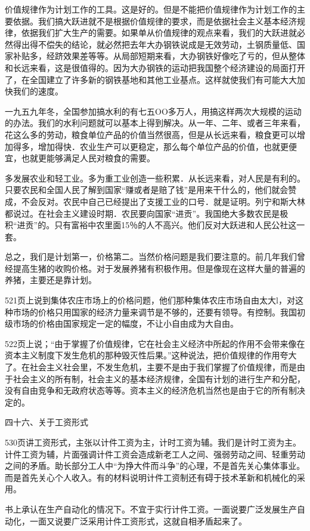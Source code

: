 价值规律作为计划工作的工具。这是好的。但是不能把价值规律作为计划工作的主要依据。我们搞大跃进就不是根据价值规律的要求，而是依据社会主义基本经济规律，依据我们扩大生产的需要。如果单从价值规律的观点来看，我们的大跃进就必然得出得不偿失的结论，就必然把去年大办钢铁说成是无效劳动，土钢质量低、国家补贴多，经跻效果差等等。从局部短期来看，大办钢铁好像吃了亏的，但从整体和长远来看，这是很值得的。因为大办钢铁的运动把我国整个经济建设的局面打开了，在全国建立了许多新的钢铁基地和其他工业基点。这样就使我们有可能大大加快我们的速度。

一九五九年冬，全国参加搞水利的有七五OO多万人，用搞这样两次大规模的运动的办法。我们的水利问题就可以基本上得到解决。从一年、二年、或者三年来看，花这么多的劳动，粮食单位产品的价值当然很高，但是从长远来看，粮食更可以增加得多，增加得快．农业生产可以更稳定，那么每个单位产品的价值，也就更便宜，也就更能够满足人民对粮食的需要。

多发展农业和轻工业。多为重工业创造一些积累．从长远来看，对人民是有利的。只要农民和全国人民了解到国家“赚或者是赔了钱”是用来干什么的，他们就会赞成，不会反对。农民中自己已经提出了支援工业的口号．就是证明。列宁和斯大林都说过。在社会主义建设时期．农民要向国家“进贡”。我国绝大多数农民是极积“进贡”的。只有富裕中农里面15％的人不高兴。他们反对大跃进和人民公社这一套。

总之，我们是计划第一，价格第二。当然价格问题是我们要注意的。前几年我们曾经提高生猪的收购价格。对于发展养猪有积极作用。但是像现在这样大量的普遍的养猪，主要还是靠计划。

521页上说到集体农庄市场上的价格问题，他们那种集体农庄市场自由太大l，对这种市场的价格只用国家的经济力量来调节是不够的，还要有领导。有控制。我国初级市场的价格由国家规定一定的幅度，不让小自由成为大自由。

522页上说；“由于掌握了价值规律，它在社会主义经济中所起的作用不会带来像在资本主义制度下发生危机的那种毁灭性后果。”这种说法，把价值规律的作用夸大了。在社会主义社会里，不发生危机，主要不是由于我们掌握了价值规律，而是由于社会主义的所有制，社会主义的基本经济规律，全国有计划的进行生产和分配，没有自由竞争和无政府状态等等。资本主义的经济危机当然也是由于它的所有制决定的。

四十六、关于工资形式

530页讲工资形式，主张以计件工资为主，计时工资为辅。我们是计时工资为主。计件工资为辅，片面强调计件工资会造成新老工人之间、强弱劳动之间、轻重劳动之间的矛盾。助长部分工人中“为挣大件而斗争”的心理，不是首先关心集体事业。而是首先关心个人收入。有的材料说明计件工资制还有碍于技术革新和机械化的采用。

书上承认在生产自动化的情况下。不宜于实行计件工资。一面说要广泛发展生产自动化，一面又说要广泛采用计件工资形式，这就自相矛盾起来了。

